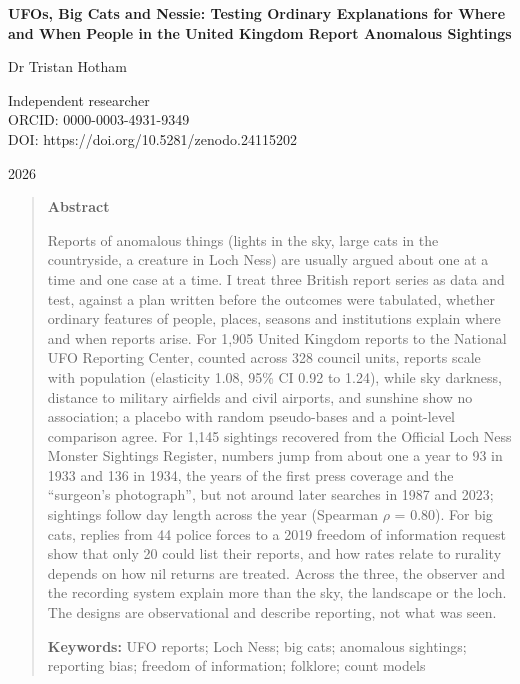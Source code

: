 \documentclass[11pt,a4paper]{article}
\begin{document}
\begin{center}
{\Large\bfseries UFOs, Big Cats and Nessie: Testing Ordinary Explanations for Where and When People in the United Kingdom Report Anomalous Sightings\par}
\vspace{1.2em}
{\large Dr Tristan Hotham\par}
\vspace{0.3em}
{\small Independent researcher\\
ORCID: 0000-0003-4931-9349\\
DOI: https://doi.org/10.5281/zenodo.24115202\par}
\vspace{0.8em}
2026
\end{center}

\begin{quote}
\small
\begin{center}\textbf{Abstract}\end{center}
Reports of anomalous things (lights in the sky, large cats in the countryside, a creature in Loch Ness) are usually argued about one at a time and one case at a time. I treat three British report series as data and test, against a plan written before the outcomes were tabulated, whether ordinary features of people, places, seasons and institutions explain where and when reports arise. For 1,905 United Kingdom reports to the National UFO Reporting Center, counted across 328 council units, reports scale with population (elasticity 1.08, 95\% CI 0.92 to 1.24), while sky darkness, distance to military airfields and civil airports, and sunshine show no association; a placebo with random pseudo-bases and a point-level comparison agree. For 1,145 sightings recovered from the Official Loch Ness Monster Sightings Register, numbers jump from about one a year to 93 in 1933 and 136 in 1934, the years of the first press coverage and the ``surgeon's photograph'', but not around later searches in 1987 and 2023; sightings follow day length across the year (Spearman $\rho$ = 0.80). For big cats, replies from 44 police forces to a 2019 freedom of information request show that only 20 could list their reports, and how rates relate to rurality depends on how nil returns are treated. Across the three, the observer and the recording system explain more than the sky, the landscape or the loch. The designs are observational and describe reporting, not what was seen.

\textbf{Keywords:} UFO reports; Loch Ness; big cats; anomalous sightings; reporting bias; freedom of information; folklore; count models
\end{quote}
\end{document}
